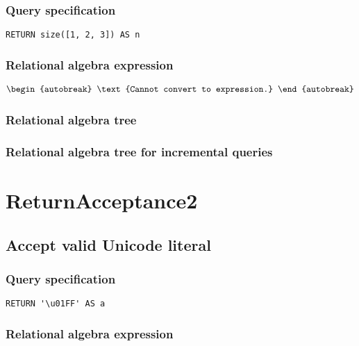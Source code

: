 \subsubsection*{Query specification}

\begin{lstlisting}
RETURN size([1, 2, 3]) AS n
\end{lstlisting}

\subsubsection*{Relational algebra expression}

\begin{align*}
\begin{autobreak}
\text{Cannot convert to expression.}
\end{autobreak}
\end{align*}

\subsubsection*{Relational algebra tree}


\subsubsection*{Relational algebra tree for incremental queries}

\section{ReturnAcceptance2}


\subsection{Accept valid Unicode literal}

\subsubsection*{Query specification}

\begin{lstlisting}
RETURN '\u01FF' AS a
\end{lstlisting}

\subsubsection*{Relational algebra expression}

